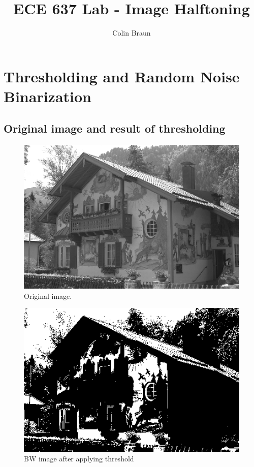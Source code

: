 \documentclass{article}
\title{ECE 637 Lab - Image Halftoning}
\author{Colin Braun}
\begin{document}
\maketitle

\section{Thresholding and Random Noise Binarization}
\subsection{Original image and result of thresholding}
\begin{figure}[H]
    \centering
    \includegraphics[width=1\textwidth]{../house.png}
    \caption{Original image.}
\end{figure}
\begin{figure}[H]
    \centering
    \includegraphics[width=1\textwidth]{../3-thresholded-image.png}
    \caption{BW image after applying threshold}
\end{figure}
\end{document}
